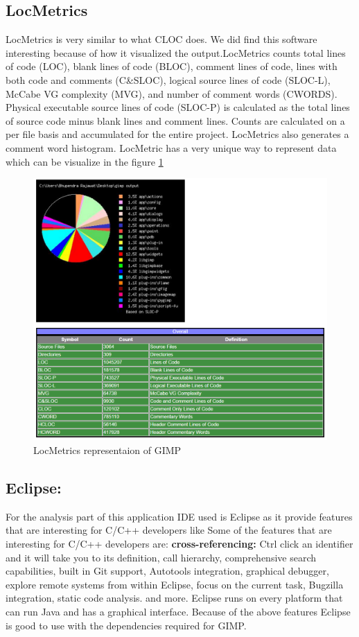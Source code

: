 \subsection{LocMetrics}
LocMetrics\cite{LocMetrics} is very similar to what CLOC does. We did find this software interesting because of how it visualized the output.LocMetrics counts total lines of code (LOC), blank lines of code (BLOC), comment lines of code, lines with both code and comments (C\&SLOC), logical source lines of code (SLOC-L), McCabe VG complexity (MVG), and number of comment words (CWORDS). Physical executable source lines of code (SLOC-P) is calculated as the total lines of source code minus blank lines and comment lines. Counts are calculated on a per file basis and accumulated for the entire project. LocMetrics also generates a comment word histogram. \cite{LocMetrics} 
\newline LocMetric has a very unique way to represent data which can be visualize in the figure \ref{fig:LocMetrics representaion of GIMP}
\begin{figure}[h]
	\centering
	\includegraphics[width=0.9\linewidth, height=0.5\textheight]{"Lines of code"}
	\caption{LocMetrics representaion of GIMP}
	\label{fig:LocMetrics representaion of GIMP}
\end{figure}
\subsection{Eclipse:}
For the analysis part of this application IDE used is Eclipse as it provide features that are interesting for C/C++ developers like Some of the features that are interesting for C/C++ developers are:
\textbf{cross-referencing:} Ctrl click an identifier and it will take you to its definition,
call hierarchy,
comprehensive search capabilities,
built in Git support,
Autotools integration,
graphical debugger,
explore remote systems from within Eclipse,
focus on the current task,
Bugzilla integration,
static code analysis.
and more. Eclipse runs on every platform that can run Java and has a graphical interface. Because of the above features Eclipse is good to use with the dependencies required for GIMP.
